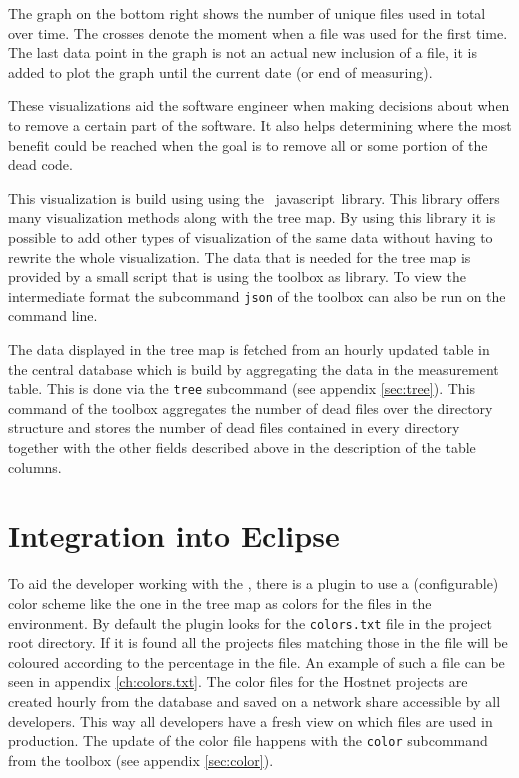 The graph on the bottom right shows the number of unique files used in total over time. The crosses denote the moment when a file was used for the first time. The last data point in the graph is not an actual new inclusion of a file, it is added to plot the graph until the current date (or end of measuring).

These visualizations aid the software engineer when making decisions about when to remove a certain part of the software. It also helps determining where the most benefit could be reached when the goal is to remove all or some portion of the dead code.



This visualization is build using using the ~javascript~library. This library offers many visualization methods along with the tree map. By using this library it is possible to add other types of visualization of the same data without having to rewrite the whole visualization. The data that is needed for the tree map is provided by a small script that is using the toolbox as library. To view the intermediate format the subcommand \verb|json| of the toolbox can also be run on the command line. 

The data displayed in the tree map is fetched from an hourly updated table in the central database which is build by aggregating the data in the measurement table. This is done via the \verb|tree| subcommand (see appendix \ref{sec:tree}). This command of the toolbox aggregates the number of dead files over the directory structure and stores the number of dead files contained in every directory together with the other fields described above in the description of the table columns.
 
 
\section{Integration into Eclipse}
To aid the developer working with the \ide, there is a plugin to use a (configurable) color scheme like the one in the tree map as colors for the files in the  environment. By default the plugin looks for the \verb|colors.txt| file in the project root directory. If it is found all the projects files matching those in the file will be coloured according to the percentage in the file. An example of such a file can be seen in appendix \ref{ch:colors.txt}. The color files for the Hostnet projects are created hourly from the database and saved on a network share accessible by all developers. This way all developers have a fresh view on which files are used in production. The update of the color file happens with the \verb|color| subcommand from the toolbox (see appendix \ref{sec:color}).
